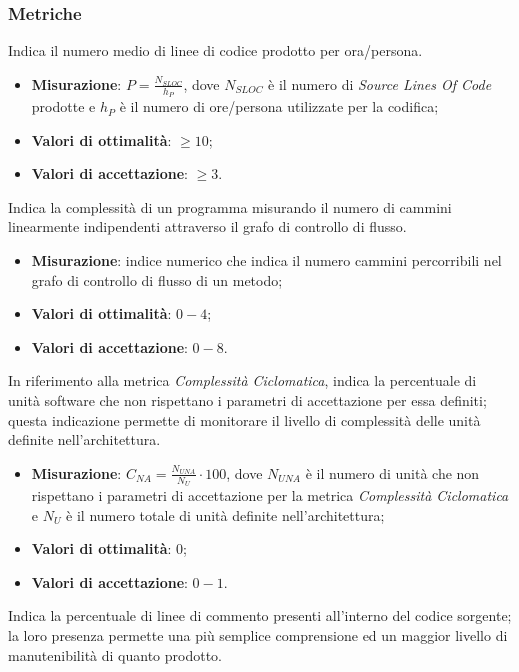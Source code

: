 \subsubsection{Metriche}
\label{prodCod}
Indica il numero medio di linee di codice prodotto per ora/persona.
\begin{itemize}
\item \textbf{Misurazione}: $P=\frac{N_{SLOC}}{h_{P}}$, dove $N_{SLOC}$ è il numero di \textit{Source Lines Of Code} prodotte e $h_{P}$ è il numero di ore/persona utilizzate per la codifica;
\item \textbf{Valori di ottimalità}: $\geq 10$;
\item \textbf{Valori di accettazione}: $\geq 3$.
\end{itemize}
\label{complCiclom}
Indica la complessità di un programma misurando il numero di cammini linearmente indipendenti attraverso il grafo di controllo di flusso.
\begin{itemize}
\item \textbf{Misurazione}: indice numerico che indica il numero cammini percorribili nel grafo di controllo di flusso di un metodo;
\item \textbf{Valori di ottimalità}: $0 - 4$;
\item \textbf{Valori di accettazione}: $0 - 8$.
\end{itemize}
\label{complCiclomNA}
In riferimento alla metrica \textit{Complessità Ciclomatica}, indica la percentuale di unità software che non rispettano i parametri di accettazione per essa definiti; questa indicazione permette di monitorare il livello di complessità delle unità definite nell'architettura.
\begin{itemize}
\item \textbf{Misurazione}: $C_{NA}=\frac{N_{UNA}}{N_{U}} \cdot 100$, dove $N_{UNA}$ è il numero di unità che non rispettano i parametri di accettazione per la metrica \textit{Complessità Ciclomatica} e $N_{U}$ è il numero totale di unità definite nell'architettura;
\item \textbf{Valori di ottimalità}: $0$;
\item \textbf{Valori di accettazione}: $0 - 1$.
\end{itemize}
\label{lineeCommento}
Indica la percentuale di linee di commento presenti all'interno del codice sorgente; la loro presenza permette una più semplice comprensione ed un maggior livello di manutenibilità di quanto prodotto.
